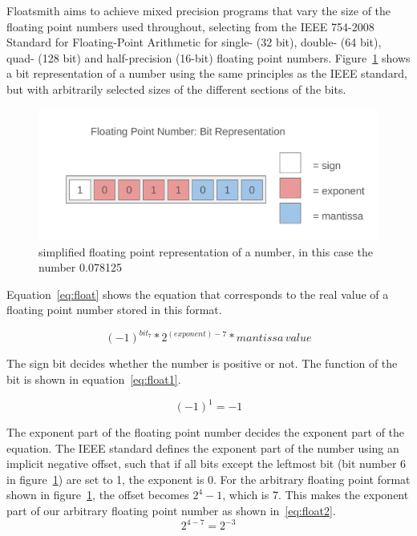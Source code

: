 Floatsmith aims to achieve mixed precision programs that vary the size of the floating point numbers used throughout, selecting from the IEEE 754-2008 Standard for Floating-Point Arithmetic for single- (32 bit), double- (64 bit), quad- (128 bit) and half-precision (16-bit) floating point numbers. Figure~\ref{fig:float_bit_representation} shows a bit representation of a number using the same principles as the IEEE standard, but with arbitrarily selected sizes of the different sections of the bits.
\begin{figure}
    \centering
    \includegraphics[width=0.5\linewidth]{Images/float_bit_representation.png}
    \caption{simplified floating point representation of a number, in this case the number 0.078125}
    \label{fig:float_bit_representation}
\end{figure}

Equation~\ref{eq:float} shows the equation that corresponds to the real value of a floating point number stored in this format.

\begin{equation}\label{eq:float}
    (-1)^{bit_7} * 2^{(exponent) - 7} * mantissa \, value
\end{equation}

The sign bit decides whether the number is positive or not. The function of the bit is shown in equation~\ref{eq:float1}.

\begin{equation} \label{eq:float1}
    (-1)^{1} = -1
\end{equation}

The exponent part of the floating point number decides the exponent part of the equation. The IEEE standard defines the exponent part of the number using an implicit negative offset, such that if all bits except the leftmost bit (bit number 6 in figure~\ref{fig:float_bit_representation}) are set to 1, the exponent is 0. For the arbitrary floating point format shown in figure~\ref{fig:float_bit_representation}, the offset becomes $2^4 - 1$, which is 7. This makes the exponent part of our arbitrary floating point number as shown in~\ref{eq:float2}.
\begin{equation} \label{eq:float2}
    2^{4-7} = 2^{-3}
\end{equation}

